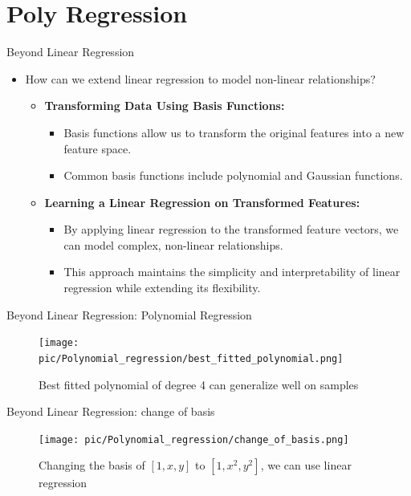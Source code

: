 \documentclass[serif, aspectratio=169]{beamer}
\begin{document}
\section{Poly Regression}
\begin{frame}{Beyond Linear Regression}
    \begin{itemize}
        \item How can we extend linear regression to model non-linear relationships?
        \begin{itemize}
            \item \textbf{Transforming Data Using Basis Functions:}
            \begin{itemize}
                \item Basis functions allow us to transform the original features into a new feature space.
                \item Common basis functions include polynomial and Gaussian functions.
            \end{itemize}
            \item \textbf{Learning a Linear Regression on Transformed Features:}
            \begin{itemize}
                \item By applying linear regression to the transformed feature vectors, we can model complex, non-linear relationships.
                \item This approach maintains the simplicity and interpretability of linear regression while extending its flexibility.
            \end{itemize}
        \end{itemize}
    \end{itemize}
\end{frame}

\begin{frame}{Beyond Linear Regression: Polynomial Regression}
    \begin{figure}[h]
        \centering
        \texttt{[image: pic/Polynomial\_regression/best\_fitted\_polynomial.png]}
        \caption{Best fitted polynomial of degree 4 can generalize well on samples}
    \end{figure}
\end{frame}

\begin{frame}{Beyond Linear Regression: change of basis}
    \begin{figure}[h]
    \centering
    \texttt{[image: pic/Polynomial\_regression/change\_of\_basis.png]}
    \caption{Changing the basis of \( [1, x, y] \) to \( [1, x^2, y^2] \), we can use linear regression}
    \end{figure}
\end{frame}
\end{document}
